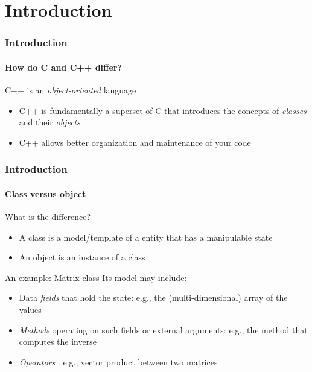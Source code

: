 \section{Introduction}

\begin{frame}
\frametitle{Introduction}
\framesubtitle{How do C and C++ differ?}

\begin{block}{C++ is an {\em object-oriented} language}
\begin{itemize}
\item C++ is fundamentally a superset of C that introduces the concepts of {\em classes} and their {\em objects}
\item C++ allows better organization and maintenance of your code
\end{itemize}
\end{block}

\end{frame}

\begin{frame}
\frametitle{Introduction}
\framesubtitle{Class versus object}


\begin{block}{What is the difference?}
\begin{itemize}
\item A class is a model/template of a entity that has a manipulable state
\item An object is an instance of a class
\end{itemize}
\end{block}
\pause
\begin{block}{An example: Matrix class}
Its model may include:
\begin{itemize}
\item Data {\em fields} that hold the state: e.g., the (multi-dimensional) array of the values
\item {\em Methods} operating on such fields or external arguments: e.g., the method that computes the inverse
\item {\em Operators} : e.g., vector product between two matrices
\end{itemize}
\end{block}

\end{frame}

